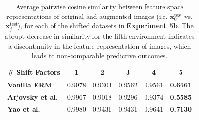 \begin{table}[H]
    \centering
    \caption{
        Comparison of PA, $\operatorname{AFR}_{\text{P}}$ and $\operatorname{AFR}_{\text{T}}$ scores
        for ERM, IRM and LISA learning algorithms with $\alpha=1$ for \textbf{Experiment 5b}. The 
        highest robustness score is emboldened for every case. PA is 
        able to discriminate algorithms consistently and distinguish
        the first shifted factor dataset, which is drawn from source domains, from the rest.
    }
    \label{tab:shift_comparison_table}
\end{table}



\begin{table}[H]
    \centering
    \begin{tabular}{l|c|c|c|c|c}
    \# Shift Factors & 1 & 2 & 3 & 4 & 5 \\
    \midrule
    {\color{tab:blue} \textbf{Vanilla ERM}} & 0.9978 & 0.9303 & 0.9562 & 0.9561 & \textbf{0.6661} \\
    {\color{tab:orange} \textbf{Arjovsky et al.}} & 0.9967 & 0.9018 & 0.9296 & 0.9374 & \textbf{0.5585} \\
    {\color{tab:green} \textbf{Yao et al.}}  & 0.9980 & 0.9431 & 0.9431 & 0.9641 & \textbf{0.7130} \\
    \bottomrule
    \end{tabular}
    \caption{
    Average pairwise cosine similarity between feature space representations of original and
    augmented images (i.e. $\bm{x}_0^{\text{test}}$ vs. $\bm{x}_j^{\text{test}}$), for each of the shifted datasets in \textbf{Experiment 5b}. The abrupt decrease in similarity
    for the fifth environment indicates a discontinuity in the feature representation of images,
    which leads to non-comparable predictive outcomes.
    }
    \label{tab:CS_shift}
    \end{table}

